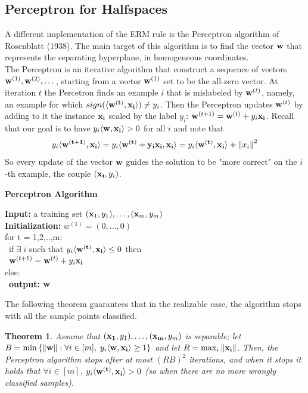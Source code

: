 \documentclass[12pt]{report}
\theoremstyle{plain}
\newtheorem{theorem}{Theorem}[chapter]
\newcommand\sprod[2]{\langle \vb{#1},\vb{#2}\rangle}
\begin{document}
\begin{flushleft}
\subsection{Perceptron for Halfspaces}
A different implementation of the ERM rule is the Perceptron algorithm of 
Rosenblatt (1938). The main target of this algorithm is to find the vector 
$\vb{w}$ that represents the separating hyperplane, in homogeneous 
coordinates.\\
The Perceptron is an iterative algorithm that construct a sequence of vectors 
$\vb{w}^{(1)},\vb{w}^{(2)},\dots$, starting from a vector $\vb{w}^{(1)}$ set to 
be the all-zero vector. At iteration $t$ the Percetron finds an example $i$ 
that is mislabeled by $\vb{w}^{(t)}$, namely, an example for which 
$sign(\sprod{w^{(t)}}{x_i})\neq y_i$. Then the Perceptron updates 
$\vb{w}^{(t)}$ by adding to it the instance $\vb{x_i}$ scaled by the label 
$y_i$: $\vb{w}^{(t+1)}=\vb{w}^{(t)}+y_i\vb{x_i}$. Recall that our goal is to 
have $y_i\sprod{w}{x_i}>0$ for all $i$ and note that
\[ y_i\sprod{w^{(t+1)}} {x_i} = y_i\sprod{w^{(t)}+y_i\vb{x_i}}{x_i} = 
y_i\sprod{w^{(t)}}{x_i}+\norm{x_i}^2 \]
So every update of the vector $\vb{w}$ guides the solution to be "more correct" 
on the $i$-th example, the couple $(\vb{x_i},y_i)$.

\begin{tcolorbox}
	\begin{center}
		\textbf{Perceptron Algorithm}
	\end{center}
	\textbf{Input:} a training set $(\vb{x}_1,y_1),\dots,(\vb{x}_m,y_m)$\\
	\textbf{Initialization:} $w^{(1)} = (0,...,0)$\\
	
	for t = 1,2,..,m:\\
	\-\ \quad	if $\exists\;i $ such that $y_i\sprod{w^{(t)}}{x_i}\leq 0$ 
	then\\
	\-\ \quad	$\vb{w}^{(t+1)}=\vb{w}^{(t)}+y_i\vb{x_i}$\\
		else:\\
	\-\ \quad	\textbf{output:} $\vb{w}$ 	
\end{tcolorbox}

The following theorem guarantees that in the realizable case, the algorithm 
stops with all the sample points classified.
\begin{theorem}
	Assume that $(\vb{x_1},y_1),\dots,(\vb{x_m},y_m)$ is separable; let 
	$B=\min\left\{\norm{\vb{w}}:\forall i\in [m],\; y_i\sprod{w}{x_i}\geq 1 
	\right\}$ and let $R=\max_i \norm{\vb{x_i}}$. Then, the Perceptron 
	algorithm stops after at most $(RB)^2$ iterations, and when it stops it 
	holds that $\forall i\in [m]$, $y_i\sprod{\vb{w}^{(t)}}{x_i}>0$ (so when 
	there are no more wrongly classified samples).
\end{theorem}


\end{flushleft}
\end{document}
